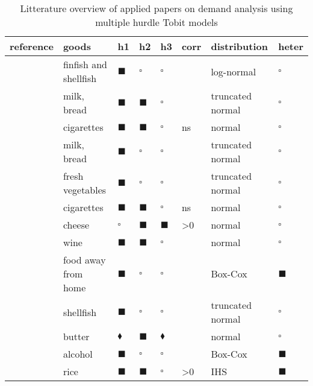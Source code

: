 \begin{table}
\begin{threeparttable}
  \caption{Litterature overview of applied papers on demand analysis using multiple hurdle Tobit models
    \label{tab:exconso}
    }
  \vspace{.5cm}
  \begin{center}
\begin{footnotesize}
\begin{tabular}{llllllll}
  \hline
reference & goods & h1 & h2 & h3 & corr & distribution & heter \\ 
  \hline
\cite{CHEN:CAPP:88} & finfish and shellfish & $\blacksquare$ & $\square$ & $\square$ &  & log-normal & $\square$ \\ 
  \cite{HAIN:GUIL:POPK:88} & milk, bread & $\blacksquare$ & $\blacksquare$ & $\square$ &  & truncated normal & $\square$ \\ 
  \cite{JONE:89} & cigarettes & $\blacksquare$ & $\blacksquare$ & $\square$ & ns & normal & $\square$ \\ 
  \cite{POPK:GUIL:HAIN:89} & milk, bread & $\blacksquare$ & $\square$ & $\square$ &  & truncated normal & $\square$ \\ 
  \cite{REYN:90} & fresh vegetables & $\blacksquare$ & $\square$ & $\square$ &  & truncated normal & $\square$ \\ 
  \cite{BLAY:BLIS:92b} & cigarettes & $\blacksquare$ & $\blacksquare$ & $\square$ & ns & normal & $\square$ \\ 
  \cite{GOUL:92} & cheese & $\square$ & $\blacksquare$ & $\blacksquare$ & >0 & normal & $\square$ \\ 
  \cite{BLAY:BLIS:93} & wine & $\blacksquare$ & $\blacksquare$ & $\square$ &  & normal & $\square$ \\ 
  \cite{YEN:93} & food away from home & $\blacksquare$ & $\square$ & $\square$ &  & Box-Cox & $\blacksquare$ \\ 
  \cite{LIN:MILO:93} & shellfish & $\blacksquare$ & $\square$ & $\square$ &  & truncated normal & $\square$ \\ 
  \cite{BLIS:BLAY:93} & butter & $\blacklozenge$ & $\blacksquare$ & $\blacklozenge$ &  & normal & $\square$ \\ 
  \cite{YEN:94} & alcohol & $\blacksquare$ & $\square$ & $\square$ &  & Box-Cox & $\blacksquare$ \\ 
  \cite{GAO:WAIL:CRAM:95} & rice & $\blacksquare$ & $\blacksquare$ & $\square$ & >0 & IHS & $\blacksquare$ \\ 

\end{tabular}
\end{footnotesize}
\end{center}
\end{threeparttable}
\end{table}
